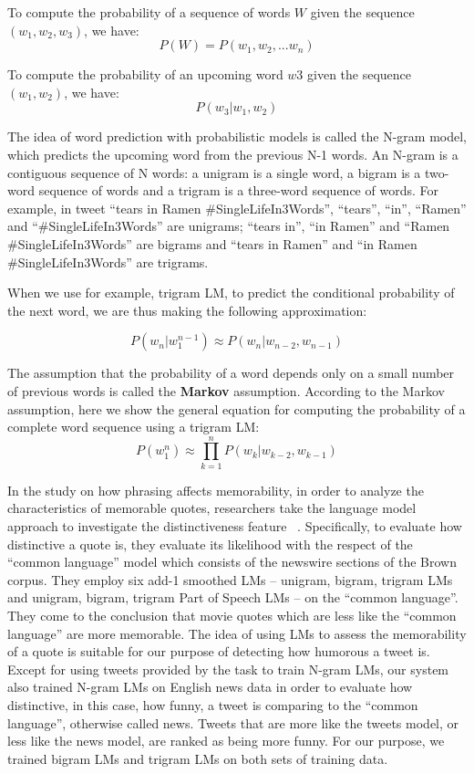 \documentclass[11pt,a4paper]{article}
\begin{document}
To compute the probability of a sequence of words $W$ given the sequence $(w_{1},w_{2},w_{3})$, we have:
\begin{equation}
P(W) = P(w_{1},w_{2},...w_{n})
\end{equation}

To compute the probability of an upcoming word $w3$ given the sequence $(w_{1},w_{2})$, we have:
\begin{equation}
P(w_{3}|w_{1},w_{2})
\end{equation}

The idea of word prediction with probabilistic models is called the N-gram model, which predicts the upcoming word from the previous N-1 words. An N-gram is a contiguous sequence of N words: a unigram is a single word, a bigram is a two-word sequence of words and a trigram is a three-word sequence of words. For example, in tweet ``tears in Ramen \#SingleLifeIn3Words'', ``tears'', ``in'', ``Ramen'' and ``\#SingleLifeIn3Words'' are unigrams; ``tears in'', ``in Ramen'' and ``Ramen \#SingleLifeIn3Words'' are bigrams and ``tears in Ramen'' and ``in Ramen \#SingleLifeIn3Words'' are trigrams.

When we use for example, trigram LM, to predict the conditional probability of the next word, we are thus making the following approximation:

\begin{equation}
P(w_n|w_1^{n-1})\approx P(w_n|w_{n-2}, w_{n-1})
\end{equation}

The assumption that the probability of a word depends only on a small number of previous words is called the \textbf{Markov} assumption. According to the Markov assumption, here we show the general equation for computing the probability of a complete word sequence using a trigram LM:
\begin{equation}
P(w_1^n)\approx \prod_{k=1}^{n} P(w_k|w_{k-2}, w_{k-1})
\end{equation}

In the study on how phrasing affects memorability, in order to analyze the characteristics of memorable quotes, researchers take the language model approach to investigate the distinctiveness feature ~\cite{hello}. Specifically, to evaluate how distinctive a quote is, they evaluate its likelihood with the respect of the ``common language'' model which consists of the newswire sections of the Brown corpus. They employ six add-1 smoothed LMs -- unigram, bigram, trigram LMs and unigram, bigram, trigram Part of Speech LMs -- on the ``common language''. They come to the conclusion that movie quotes which are less like the ``common language'' are more memorable. The idea of using LMs to assess the memorability of a quote is suitable for our purpose of detecting how humorous a tweet is. Except for using tweets provided by the task to train N-gram LMs, our system also trained N-gram LMs on English news data in order to evaluate how distinctive, in this case, how funny, a tweet is comparing to the ``common language'', otherwise called news. Tweets that are more like the tweets model, or less like the news model, are ranked as being more funny. For our purpose, we trained bigram LMs and trigram LMs on both sets of training data.
\end{document}
